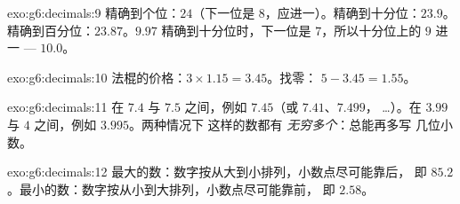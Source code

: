 \begin{solution}{exo:g6:decimals:9}
精确到个位：$24$（下一位是 $8$，应进一）。精确到十分位：$23.9$。
精确到百分位：$23.87$。$9.97$ 精确到十分位时，下一位是
$7$，所以十分位上的 $9$ 进一 --- $10.0$。
\end{solution}

\begin{solution}{exo:g6:decimals:10}
法棍的价格：$3 \times 1.15 = 3.45$。找零：
$5 - 3.45 = 1.55$。
\end{solution}

\begin{solution}{exo:g6:decimals:11}
在 $7.4$ 与 $7.5$ 之间，例如 $7.45$（或 $7.41$、$7.499$，
\dots）。在 $3.99$ 与 $4$ 之间，例如 $3.995$。两种情况下
这样的数都有 \emph{无穷多个}：总能再多写
几位小数。
\end{solution}

\begin{solution}{exo:g6:decimals:12}
最大的数：数字按从大到小排列，小数点尽可能靠后，
即 $85.2$。最小的数：数字按从小到大排列，小数点尽可能靠前，
即 $2.58$。
\end{solution}

